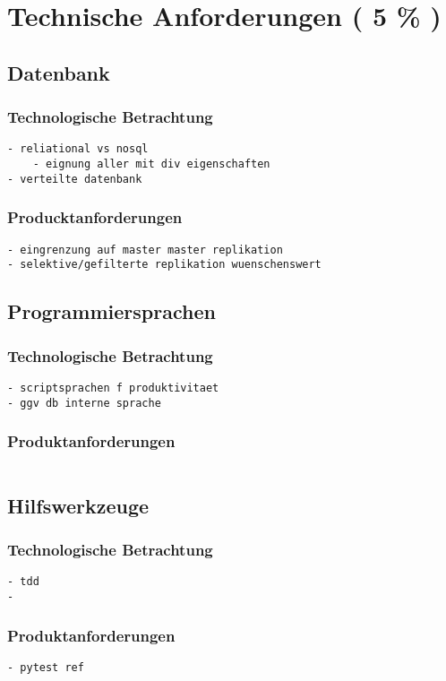 \chapter{Technische Anforderungen ( 5 \% )}

\section{Datenbank}
\subsection{Technologische Betrachtung}

\begin{verbatim}
- reliational vs nosql
    - eignung aller mit div eigenschaften
- verteilte datenbank
\end{verbatim}


\subsection{Producktanforderungen}

\begin{verbatim}
- eingrenzung auf master master replikation
- selektive/gefilterte replikation wuenschenswert
\end{verbatim}


\section{Programmiersprachen}
\subsection{Technologische Betrachtung}

\begin{verbatim}
- scriptsprachen f produktivitaet
- ggv db interne sprache
\end{verbatim}

\subsection{Produktanforderungen}

\begin{verbatim}

\end{verbatim}


\section{Hilfswerkzeuge}
\subsection{Technologische Betrachtung}
\begin{verbatim}
- tdd
- 
\end{verbatim}
\subsection{Produktanforderungen}
\begin{verbatim}
- pytest ref
\end{verbatim}
